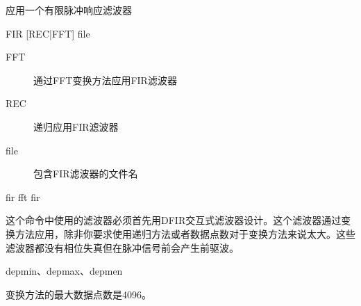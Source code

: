 \label{cmd:fir}

应用一个有限脉冲响应滤波器

\begin{SACSTX}
FIR [REC|FFT] file
\end{SACSTX}

\begin{description}
\item [FFT] 通过FFT变换方法应用FIR滤波器
\item [REC] 递归应用FIR滤波器
\item [file] 包含FIR滤波器的文件名
\end{description}

\begin{SACDFT}
fir fft fir
\end{SACDFT}

这个命令中使用的滤波器必须首先用DFIR交互式滤波器设计。这个滤波器通过变换方法应用，除非你要求使用递归方法或者数据点数对于变换方法来说太大。这些滤波器都没有相位失真但在脉冲信号前会产生前驱波。

depmin、depmax、depmen

变换方法的最大数据点数是4096。
